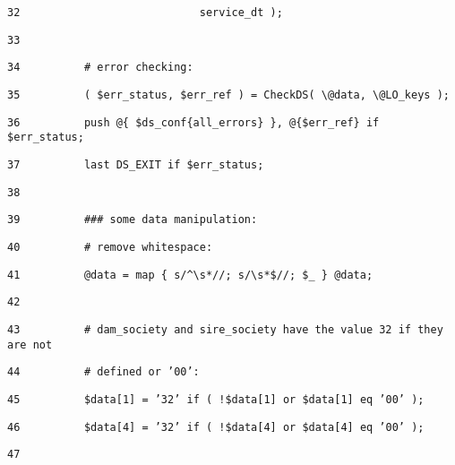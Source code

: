 \begin{table}[htbp]
\texttt{\scriptsize 32~~~~~~~~~~~~~~~~~~~~~~~~~~~
service\_dt );}{\scriptsize \par}

\texttt{\scriptsize 33 }{\scriptsize \par}

\texttt{\scriptsize 34~~~~~~~~~ \# error checking:}{\scriptsize \par}

\texttt{\scriptsize 35~~~~~~~~~ ( \$err\_status, \$err\_ref
) = CheckDS( \textbackslash{}@data, \textbackslash{}@LO\_keys );}{\scriptsize \par}

\texttt{\scriptsize 36~~~~~~~~~ push @\{ \$ds\_conf\{all\_errors\}
\}, @\{\$err\_ref\} if \$err\_status;}{\scriptsize \par}

\texttt{\scriptsize 37~~~~~~~~~ last DS\_EXIT if \$err\_status;}{\scriptsize \par}

\texttt{\scriptsize 38 }{\scriptsize \par}

\texttt{\scriptsize 39~~~~~~~~~ \#\#\# some data manipulation:}{\scriptsize \par}

\texttt{\scriptsize 40~~~~~~~~~ \# remove whitespace:}{\scriptsize \par}

\texttt{\scriptsize 41~~~~~~~~~ @data = map \{ s/\textasciicircum{}\textbackslash{}s{*}//;
s/\textbackslash{}s{*}\$//; \$\_ \} @data;}{\scriptsize \par}

\texttt{\scriptsize 42 }{\scriptsize \par}

\texttt{\scriptsize 43~~~~~~~~~ \# dam\_society and sire\_society
have the value 32 if they are not}{\scriptsize \par}

\texttt{\scriptsize 44~~~~~~~~~ \# defined or '00':}{\scriptsize \par}

\texttt{\scriptsize 45~~~~~~~~~ \$data{[}1{]} = '32' if (
!\$data{[}1{]} or \$data{[}1{]} eq '00' );}{\scriptsize \par}

\texttt{\scriptsize 46~~~~~~~~~ \$data{[}4{]} = '32' if (
!\$data{[}4{]} or \$data{[}4{]} eq '00' );}{\scriptsize \par}

\texttt{\scriptsize 47 }{\scriptsize \par}


\end{table}
